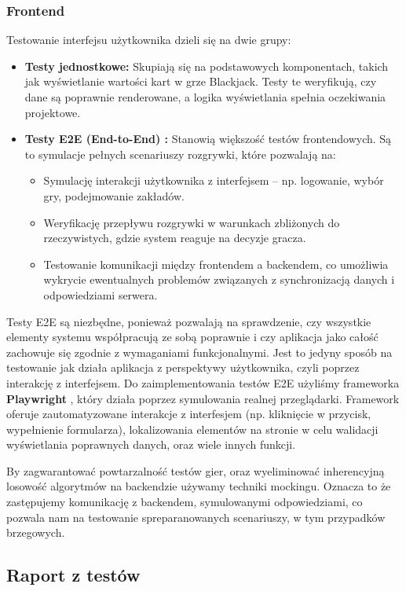 \documentclass[a4paper,12pt]{article}
\begin{document}
\subsubsection{Frontend}
Testowanie interfejsu użytkownika dzieli się na dwie grupy:
\begin{itemize}[noitemsep]
    \item \textbf{Testy jednostkowe:} Skupiają się na podstawowych komponentach, takich jak wyświetlanie wartości kart w grze Blackjack. Testy te weryfikują, czy dane są poprawnie renderowane, a logika wyświetlania spełnia oczekiwania projektowe.
    \item \textbf{Testy E2E (End-to-End) \cite{e2e}:} Stanowią większość testów frontendowych. Są to symulacje pełnych scenariuszy rozgrywki, które pozwalają na:
    \begin{itemize}[noitemsep]
        \item Symulację interakcji użytkownika z interfejsem – np. logowanie, wybór gry, podejmowanie zakładów.
        \item Weryfikację przepływu rozgrywki w warunkach zbliżonych do rzeczywistych, gdzie system reaguje na decyzje gracza.
        \item Testowanie komunikacji między frontendem a backendem, co umożliwia wykrycie ewentualnych problemów związanych z synchronizacją danych i odpowiedziami serwera.
    \end{itemize}
\end{itemize}
Testy E2E są niezbędne, ponieważ pozwalają na sprawdzenie, czy wszystkie elementy systemu współpracują ze sobą poprawnie i czy aplikacja jako całość zachowuje się zgodnie z wymaganiami funkcjonalnymi. Jest to jedyny sposób na testowanie jak działa aplikacja z perspektywy użytkownika, czyli poprzez interakcję z interfejsem. Do zaimplementowania testów E2E użyliśmy frameworka \textbf{Playwright} \cite{playwright}, który działa poprzez symulowania realnej przeglądarki. Framework oferuje zautomatyzowane interakcje z interfesjem (np. kliknięcie w przycisk, wypełnienie formularza), lokalizowania elementów na stronie w celu walidacji wyświetlania poprawnych danych, oraz wiele innych funkcji. 

By zagwarantować powtarzalność testów gier, oraz wyeliminować inherencyjną losowość algorytmów na backendzie używamy techniki mockingu. Oznacza to że zastępujemy komunikację z backendem, symulowanymi odpowiedziami, co pozwala nam na testowanie spreparanowanych scenariuszy, w tym przypadków brzegowych.

\subsection{Raport z testów}
\end{document}
